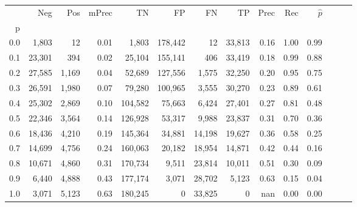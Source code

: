 \begin{tabular}{rrrrrrrrrrrrrr}
\toprule
{} &     Neg &    Pos & mPrec &       TN &       FP &      FN &      TP &  Prec &   Rec & $\hat{p}$ \\
p   &         &        &       &          &          &         &         &       &       &           \\
\midrule
0.0 &   1,803 &     12 &  0.01 &    1,803 &  178,442 &      12 &  33,813 &  0.16 &  1.00 &      0.99 \\
0.1 &  23,301 &    394 &  0.02 &   25,104 &  155,141 &     406 &  33,419 &  0.18 &  0.99 &      0.88 \\
0.2 &  27,585 &  1,169 &  0.04 &   52,689 &  127,556 &   1,575 &  32,250 &  0.20 &  0.95 &      0.75 \\
0.3 &  26,591 &  1,980 &  0.07 &   79,280 &  100,965 &   3,555 &  30,270 &  0.23 &  0.89 &      0.61 \\
0.4 &  25,302 &  2,869 &  0.10 &  104,582 &   75,663 &   6,424 &  27,401 &  0.27 &  0.81 &      0.48 \\
0.5 &  22,346 &  3,564 &  0.14 &  126,928 &   53,317 &   9,988 &  23,837 &  0.31 &  0.70 &      0.36 \\
0.6 &  18,436 &  4,210 &  0.19 &  145,364 &   34,881 &  14,198 &  19,627 &  0.36 &  0.58 &      0.25 \\
0.7 &  14,699 &  4,756 &  0.24 &  160,063 &   20,182 &  18,954 &  14,871 &  0.42 &  0.44 &      0.16 \\
0.8 &  10,671 &  4,860 &  0.31 &  170,734 &    9,511 &  23,814 &  10,011 &  0.51 &  0.30 &      0.09 \\
0.9 &   6,440 &  4,888 &  0.43 &  177,174 &    3,071 &  28,702 &   5,123 &  0.63 &  0.15 &      0.04 \\
1.0 &   3,071 &  5,123 &  0.63 &  180,245 &        0 &  33,825 &       0 &   nan &  0.00 &      0.00 \\
\bottomrule
\end{tabular}
